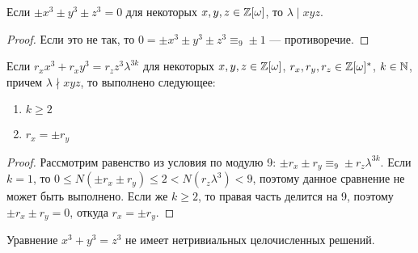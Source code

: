 \begin{corollary}
	Если $\pm x^3 \pm y^3 \pm z^3 = 0$ для некоторых $x, y, z \in \mathbb{Z}[\omega]$, то $\lambda \mid xyz$.
\end{corollary}

\begin{proof}
	Если это не так, то $0 = \pm x^3 \pm y^3 \pm z^3 \equiv_9 \pm 1$ --- противоречие.
\end{proof}

\begin{corollary}
	Если $r_xx^3 + r_xy^3 = r_zz^3\lambda^{3k}$ для некоторых $x, y, z \in \mathbb{Z}[\omega]$, $r_x, r_y, r_z \in \mathbb{Z}[\omega]^*$, $k \in \mathbb{N}$, причем $\lambda \nmid xyz$, то выполнено следующее:
	\begin{enumerate}
		\item $k \ge 2$
		\item $r_x = \pm r_y$
	\end{enumerate}
\end{corollary}

\begin{proof}
	Рассмотрим равенство из условия по модулю 9: $\pm r_x \pm r_y \equiv_9 \pm r_z\lambda^{3k}$. Если $k = 1$, то $0 \le N(\pm r_x \pm r_y) \le 2 < N(r_z\lambda^{3})< 9$, поэтому данное сравнение не может быть выполнено. Если же $k \ge 2$, то правая часть делится на 9, поэтому $\pm r_x \pm r_y = 0$, откуда $r_x = \pm r_y$.
\end{proof}

\begin{theorem}[Великая теорема Ферма при $n = 3$]
	Уравнение $x^3 + y^3 = z^3$ не имеет нетривиальных целочисленных решений.
\end{theorem}

